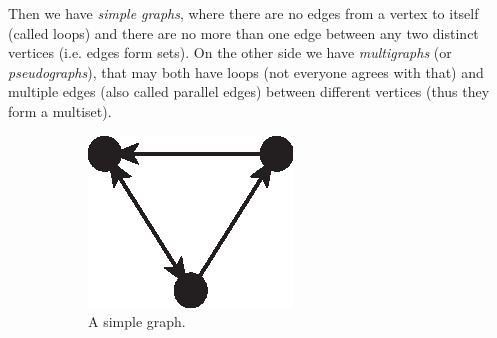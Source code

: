       Then we have \emph{simple graphs}, where there are no edges from a vertex to itself (called loops) and there are no more than one edge between any two distinct vertices (i.e. edges form sets). On the other side we have \emph{multigraphs} (or \emph{pseudographs}), that may both have loops (not everyone agrees with that) and multiple edges (also called parallel edges) between different vertices (thus they form a multiset).
      \begin{figure}[H]
        \centering        
          \begin{subfigure}[b]{0.25\textwidth}
            \includegraphics[width=\textwidth]{chapters/02_problem_definition/graph_simple}
            \caption{A simple graph.}
            \label{fig:graphs_orientation_undirected}
          \end{subfigure}
          \qquad\qquad\qquad
          \begin{subfigure}[b]{0.25\textwidth}

\end{subfigure}
\end{figure}

